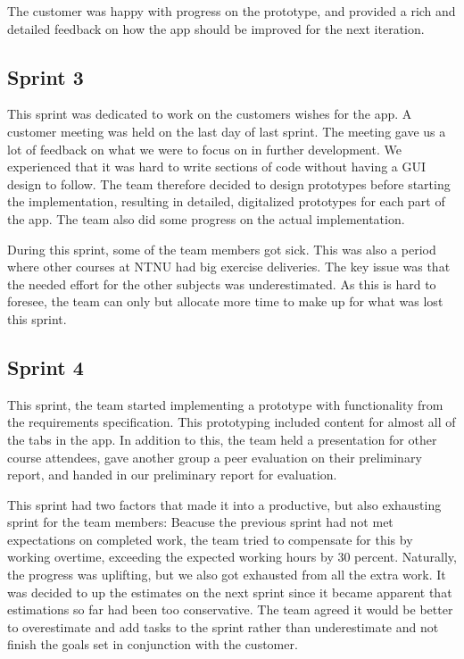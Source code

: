 The customer was happy with progress on the prototype, and provided a rich and detailed feedback on how the app should be improved for the next iteration.

\subsection{Sprint 3}
This sprint was dedicated to work on the customers wishes for the app. A customer meeting was held on the last day of last sprint. The meeting gave us a lot of feedback on what we were to focus on in further development. We experienced that it was hard to write sections of code without having a GUI design to follow. The team therefore decided to design prototypes before starting the implementation, resulting in detailed, digitalized prototypes for each part of the app. The team also did some progress on the actual implementation.

During this sprint, some of  the team members got sick. This was also a period where other courses at NTNU had big exercise deliveries. The key issue was that the needed effort for the other subjects was underestimated. As this is hard to foresee, the team can only but allocate more time to make up for what was lost this sprint.

\subsection{Sprint 4}
This sprint, the team started implementing a prototype with functionality from the requirements specification. This prototyping included content for almost all of the tabs in the app. In addition to this, the team held a presentation for other course attendees, gave another group a peer evaluation on their preliminary report, and handed in our preliminary report for evaluation.

This sprint had two factors that made it into a productive, but also exhausting sprint for the team members: Beacuse the previous sprint had not met expectations on completed work, the team tried to compensate for this by working overtime, exceeding the expected working hours by 30 percent. Naturally, the progress was uplifting, but we also got exhausted from all the extra work. It was decided to up the estimates on the next sprint since it became apparent that estimations so far had been too conservative. The team agreed it would be better to overestimate and add tasks to the sprint rather than underestimate and not finish the goals set in conjunction with the customer.

